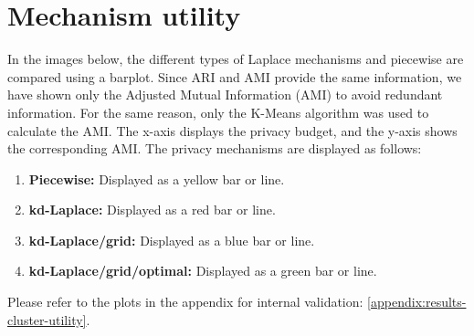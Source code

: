 \section{Mechanism utility}
In the images below, the different types of Laplace mechanisms and piecewise are compared using a barplot.
Since ARI and AMI provide the same information, we have shown only the Adjusted Mutual Information (AMI) to avoid redundant information.
For the same reason, only the K-Means algorithm was used to calculate the AMI.
The x-axis displays the privacy budget, and the y-axis shows the corresponding AMI.
The privacy mechanisms are displayed as follows:
\begin{enumerate}
    \item \textbf{Piecewise:} Displayed as a yellow bar or line.
    \item \textbf{kd-Laplace:} Displayed as a red bar or line.
    \item \textbf{kd-Laplace/grid:} Displayed as a blue bar or line.
    \item \textbf{kd-Laplace/grid/optimal:} Displayed as a green bar or line.
\end{enumerate}

Please refer to the plots in the appendix for internal validation: \ref{appendix:results-cluster-utility}.
\newpage
